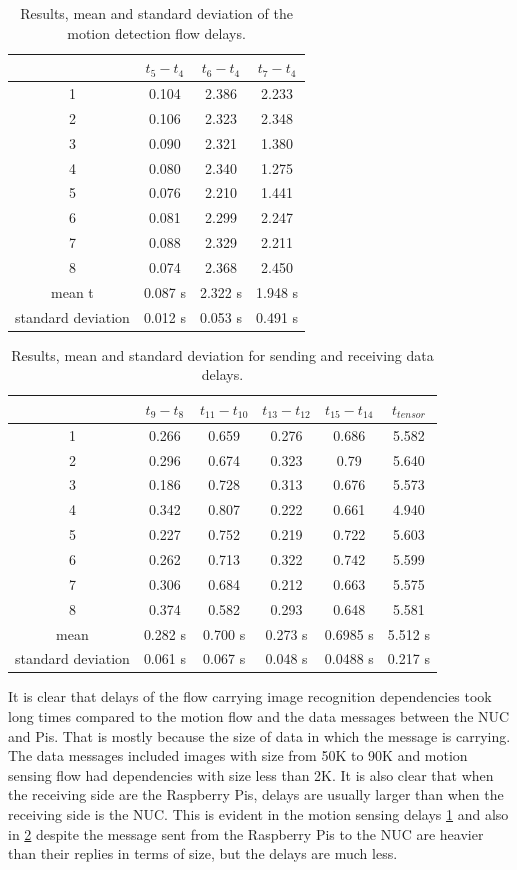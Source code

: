 \begin{table}[H]
\centering
\begin{tabular}{*{4}{c}}\toprule
&$t_5 - t_4$  & $t_6 - t_4$  & $t_7-t_4$ \\ \midrule
1&	0.104&	2.386&	2.233\\
2&	0.106&	2.323&	2.348\\
3&	0.090&	2.321&	1.380\\
4&	0.080&	2.340&	1.275\\
5&	0.076& 2.210&	1.441\\
6&	0.081&	2.299&	2.247\\
7& 0.088&	2.329&	2.211\\
8&	0.074&	2.368&	2.450\\
mean t&0.087 s&2.322 s&1.948 s\\
standard deviation&0.012 s&0.053 s&0.491 s\\
\end{tabular}
\caption{Results, mean and standard deviation of the motion detection flow delays.}
\label{table:motion}
\end{table}

\begin{table}[H]
\centering
\begin{tabular}{*{6}{c}}	\toprule
&$t_9 - t_8$  & $t_{11} - t_{10}$  & $t_{13}-t_{12}$ & $t_{15}-t_{14}$&  $t_{tensor}$ \\ \midrule
1&	0.266&	0.659&	0.276&	0.686&	5.582\\
2&	0.296&	0.674&	0.323&	0.79&	5.640\\
3&	0.186&	0.728&	0.313&	0.676&	5.573\\
4&	0.342&	0.807&	0.222&	0.661&	4.940\\
5&	0.227&	0.752&	0.219&	0.722&	5.603\\
6&	0.262&	0.713&	0.322&	0.742&	5.599\\
7&	0.306&	0.684&	0.212&	0.663&	5.575\\
8&	0.374&	0.582&	0.293&	0.648&	5.581\\
mean&0.282 s&0.700 s&	0.273 s&0.6985 s&5.512 s\\
standard deviation&0.061 s&0.067 s&	0.048 s&0.0488 s&0.217 s\\
	\end{tabular}
	\caption{Results, mean and standard deviation for sending and receiving data delays.}
	\label{table:data}
\end{table}

\noindent It is clear that  delays of the flow carrying image recognition dependencies took long times compared to the motion flow and the data messages between the NUC and Pis. That is mostly because the size of data in which the message is carrying. The data messages included images with size from 50K to 90K  and motion sensing flow had dependencies with size less than 2K. It is also clear that when the receiving side are the Raspberry Pis, delays are usually larger than when the receiving side is the NUC. This is evident in the motion sensing delays \ref{table:motion} and  also in \ref{table:data} despite the message sent from the Raspberry Pis to the NUC are heavier than their replies  in terms of size, but the delays are much less.

